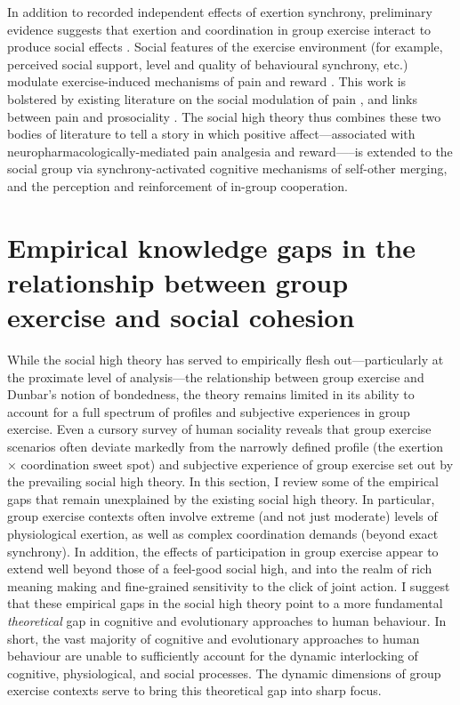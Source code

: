 \begin{CJK}{UTF8}{gbsn}
In addition to recorded independent effects of exertion synchrony,  preliminary evidence suggests that exertion and coordination in group exercise interact to produce social effects \citep{Jackson2018}.  Social features of the exercise environment (for example, perceived social support, level and quality of behavioural synchrony, etc.) modulate exercise-induced mechanisms of pain and reward \citep{Cohen2009,Sullivan2014,Tarr2015,Davis2015,Weinstein2016}. This work is bolstered by existing literature on the social modulation of pain \citep{Eisenberger2012a}, and links between pain and prosociality \citep{Bastian2014a}.  The social high theory thus combines these two bodies of literature to tell a story in which positive affect---associated with neuropharmacologically-mediated pain analgesia and reward—--is extended to the social group via synchrony-activated cognitive mechanisms of self-other merging, and the perception and reinforcement of in-group cooperation.


\section{Empirical knowledge gaps in the relationship between group exercise and social cohesion\label{sect:empKnowGaps}}
While the social high theory has served to empirically flesh out---particularly at the proximate level of analysis---the relationship between group exercise and Dunbar's notion of bondedness, the theory remains limited in its ability to account for a full spectrum of profiles and subjective experiences in group exercise.
Even a cursory survey of human sociality reveals that group exercise scenarios often deviate markedly from the narrowly defined profile (the exertion $\times$ coordination sweet spot) and subjective experience of group exercise set out by the prevailing social high theory.  In this section, I review some of the empirical gaps that remain unexplained by the existing social high theory.  In particular, group exercise contexts often involve extreme (and not just moderate) levels of physiological exertion, as well as complex coordination demands (beyond exact synchrony).  In addition, the effects of participation in group exercise appear to extend well beyond those of a feel-good social high, and into the realm of rich meaning making and fine-grained sensitivity to the click of joint action.  I suggest that these empirical gaps in the social high theory point to a more fundamental \textit{theoretical} gap in cognitive and evolutionary approaches to human behaviour. In short, the vast majority of cognitive and evolutionary approaches to human behaviour are unable to sufficiently account for the dynamic interlocking of cognitive, physiological, and social processes.  The dynamic dimensions of group exercise contexts serve to bring this theoretical gap into sharp focus.


\end{CJK}
